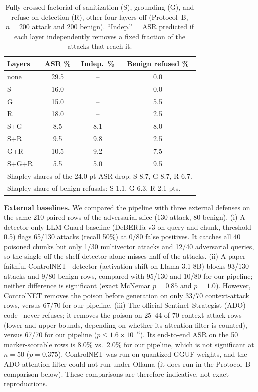 \documentclass[conference]{IEEEtran}
\begin{document}
\begin{table}[t]
\centering
\caption{Fully crossed factorial of sanitization (S), grounding (G), and refuse-on-detection (R), other four layers off (Protocol~B, $n=200$ attack and 200 benign). ``Indep.'' = ASR predicted if each layer independently removes a fixed fraction of the attacks that reach it.}
\label{tab:factorial}
\small
\begin{tabular}{lccc}
\toprule
Layers & ASR \% & Indep.\ \% & Benign refused \% \\
\midrule
none & 29.5 & -- & 0.0 \\
S & 16.0 & -- & 0.0 \\
G & 15.0 & -- & 5.5 \\
R & 18.0 & -- & 2.5 \\
S+G & 8.5 & 8.1 & 8.0 \\
S+R & 9.5 & 9.8 & 2.5 \\
G+R & 10.5 & 9.2 & 7.5 \\
S+G+R & 5.5 & 5.0 & 9.5 \\
\midrule
\multicolumn{4}{l}{\footnotesize Shapley shares of the 24.0-pt ASR drop: S 8.7, G 8.7, R 6.7.} \\
\multicolumn{4}{l}{\footnotesize Shapley share of benign refusals: S 1.1, G 6.3, R 2.1 pts.} \\
\bottomrule
\end{tabular}
\end{table}

\textbf{External baselines.} We compared the pipeline with three external defenses on the same 210 paired rows of the adversarial slice (130 attack, 80 benign). (i) A detector-only LLM-Guard baseline (DeBERTa-v3 on query and chunk, threshold 0.5) flags 65/130 attacks (recall 50\%) at 0/80 false positives. It catches all 40 poisoned chunks but only 1/30 multivector attacks and 12/40 adversarial queries, so the single off-the-shelf detector alone misses half of the attacks. (ii) A paper-faithful ControlNET~\cite{yao2025controlnet} detector (activation-shift on Llama-3.1-8B) blocks 93/130 attacks and 9/80 benign rows, compared with 95/130 and 10/80 for our pipeline; neither difference is significant (exact McNemar $p=0.85$ and $p=1.0$). However, ControlNET removes the poison before generation on only 33/70 context-attack rows, versus 67/70 for our pipeline. (iii) The official Sentinel--Strategist (ADO) code~\cite{palleria2026ado} never refuses; it removes the poison on 25--44 of 70 context-attack rows (lower and upper bounds, depending on whether its attention filter is counted), versus 67/70 for our pipeline ($p\le1.6\times10^{-6}$). Its end-to-end ASR on the 50 marker-scorable rows is 8.0\% vs.\ 2.0\% for our pipeline, which is not significant at $n=50$ ($p=0.375$). ControlNET was run on quantized GGUF weights, and the ADO attention filter could not run under Ollama (it does run in the Protocol~B comparison below). These comparisons are therefore indicative, not exact reproductions.
\end{document}
